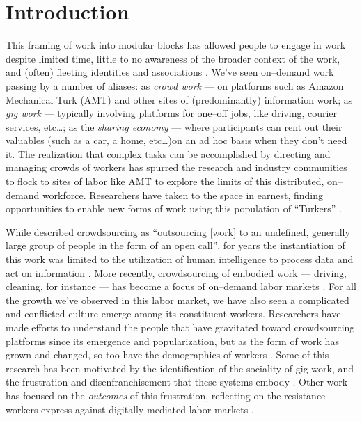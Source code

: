 \documentclass[trackingWork]{subfiles}
\begin{document}
\section{Introduction}\label{sec:introduction}

This framing of work into modular blocks
has allowed people to engage in work despite
limited time,
little to no awareness of the broader context of the work, and 
(often) fleeting identities and associations
\cite{kargerIterativeLearning,mitraComparingStrategies,latozaCrowdDev}.
We've seen on--demand work passing by a number of aliases:
as \textit{crowd work} --- on platforms such as Amazon Mechanical Turk (AMT) and other sites of (predominantly) information work;
as \textit{gig work} --- typically involving platforms for one--off jobs, like driving, courier services, etc\dots;
as the \textit{sharing economy} --- where participants can rent out their valuables (such as a car, a home, etc\dots)on an ad hoc basis when they don't need it.
The realization
that complex tasks can be accomplished by directing and managing crowds of workers
has spurred the research and industry communities to flock to sites of labor
like AMT
to explore the limits of this distributed, on--demand workforce.
Researchers have taken to the space in earnest,
finding opportunities to enable new forms of work
using this population of ``Turkers''
\cite{bernsteinSoylent,redballoon,paolacci2010running}.

While \citeauthor{howe2008crowdsourcing} described crowdsourcing as
``outsourcing [work] to an undefined, generally large group of people in the form of an open call'',
for years the instantiation of this work was limited to the utilization of
human intelligence to process data and act on information
\cite{CrowdsourcingUserStudies,movieSummarizationWu,
      yuenSurvey,geiger2011managing,quinnbedersonTaxonomy}.
More recently, crowdsourcing of embodied work
--- driving, cleaning, for instance ---
has become a focus of on--demand labor markets
\cite{uberAlgorithm,uberOfficial,zaarlyOfficial,taskrabbitOfficial}.
For all the growth we've observed in this labor market,
we have also seen a complicated and conflicted culture emerge among its constituent workers.
Researchers have made efforts to understand the people
that have gravitated toward crowdsourcing platforms
since its emergence and popularization,
but as the form of work has grown and changed, so too have the demographics of workers
\cite{Ross,whoareNOTtheTurkers}.
Some of this research has been motivated by the identification of the sociality of gig work,
and the frustration and disenfranchisement that these systems embody
\cite{turkopticon,dynamo}.
Other work has focused on the \textit{outcomes} of this frustration,
reflecting on the resistance workers express against digitally mediated labor markets
\cite{uberAlgorithm}.
\end{document}
